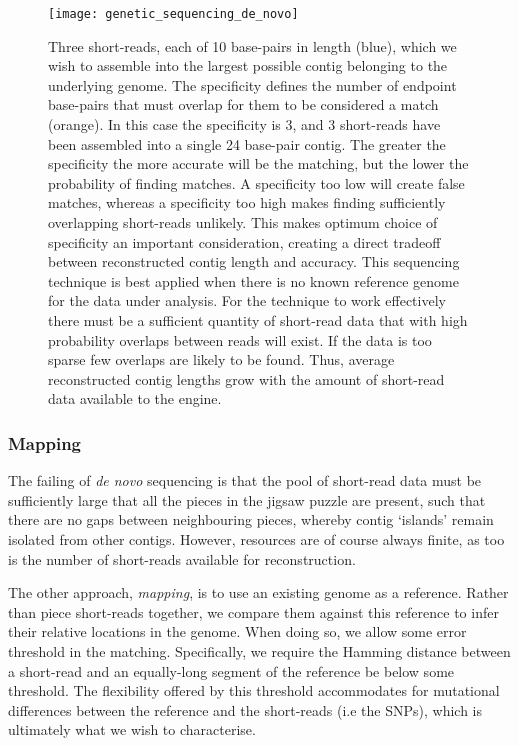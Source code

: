 \begin{figure}[!htbp]
	\texttt{[image: genetic\_sequencing\_de\_novo]}
	\captionspacefig \caption{Three short-reads, each of 10 base-pairs in length (blue), which we wish to assemble into the largest possible contig belonging to the underlying genome. The specificity defines the number of endpoint base-pairs that must overlap for them to be considered a match (orange). In this case the specificity is 3, and 3 short-reads have been assembled into a single 24 base-pair contig. The greater the specificity the more accurate will be the matching, but the lower the probability of finding matches. A specificity too low will create false matches, whereas a specificity too high makes finding sufficiently overlapping short-reads unlikely. This makes optimum choice of specificity an important consideration, creating a direct tradeoff between reconstructed contig length and accuracy. This sequencing technique is best applied when there is no known reference genome for the data under analysis. For the technique to work effectively there must be a sufficient quantity of short-read data that with high probability overlaps between reads will exist. If the data is too sparse few overlaps are likely to be found. Thus, average reconstructed contig lengths grow with the amount of short-read data available to the engine.} \label{fig:gen_seq_de_novo}
\end{figure}

%
%

\subsubsection{Mapping}

The failing of \textit{de novo} sequencing is that the pool of short-read data must be sufficiently large that all the pieces in the jigsaw puzzle are present, such that there are no gaps between neighbouring pieces, whereby contig `islands' remain isolated from other contigs. However, resources are of course always finite, as too is the number of short-reads available for reconstruction.

The other approach, \textit{mapping}, is to use an existing genome as a reference. Rather than piece short-reads together, we compare them against this reference to infer their relative locations in the genome. When doing so, we allow some error threshold in the matching. Specifically, we require the Hamming distance between a short-read and an equally-long segment of the reference be below some threshold. The flexibility offered by this threshold accommodates for mutational differences between the reference and the short-reads (i.e the SNPs), which is ultimately what we wish to characterise.

